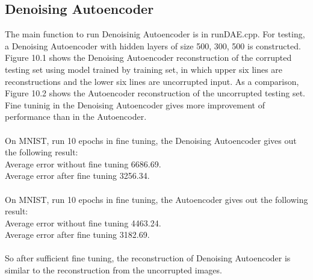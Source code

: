 \documentclass[12pt]{article}
\begin{document}
\subsection{Denoising Autoencoder}
The main function to run Denoisinig Autoencoder is in runDAE.cpp. For testing, a Denoising Autoencoder with hidden layers of size 500, 300, 500 is constructed. Figure 10.1 shows the Denoising Autoencoder reconstruction of the corrupted testing set using model trained by training set, in which upper six lines are reconstructions and the lower six lines are uncorrupted input. As a comparison, Figure 10.2 shows the Autoencoder reconstruction of the uncorrupted testing set. Fine tuninig in the Denoising Autoencoder gives more improvement of performance than in the Autoencoder.\\
\\
On MNIST, run 10 epochs in fine tuning, the Denoising Autoencoder gives out the following result:\\
Average error without fine tuning 6686.69.\\
Average error after fine tuning 3256.34.\\
\\
On MNIST, run 10 epochs in fine tuning, the Autoencoder gives out the following result:\\
Average error without fine tuning 4463.24.\\
Average error after fine tuning 3182.69.\\
\\
So after sufficient fine tuning, the reconstruction of Denoising Autoencoder is similar to the reconstruction from the uncorrupted images.\\
\end{document}
